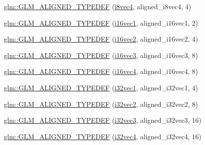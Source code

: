 \begin{DoxyCompactItemize}
\item 
\mbox{\hyperlink{group__gtx__type__aligned_ga1fe6fc032a978f1c845fac9aa0668714}{glm\+::\+G\+L\+M\+\_\+\+A\+L\+I\+G\+N\+E\+D\+\_\+\+T\+Y\+P\+E\+D\+EF}} (\mbox{\hyperlink{group__gtc__type__precision_gaaad99cfb998ddcb74e9c33d0149fdd0e}{i8vec4}}, aligned\+\_\+i8vec4, 4)
\item 
\mbox{\hyperlink{group__gtx__type__aligned_gaa4161e7a496dc96972254143fe873e55}{glm\+::\+G\+L\+M\+\_\+\+A\+L\+I\+G\+N\+E\+D\+\_\+\+T\+Y\+P\+E\+D\+EF}} (\mbox{\hyperlink{group__gtc__type__precision_ga51ac9cc5aa60aa41bf37ccbf900db94f}{i16vec1}}, aligned\+\_\+i16vec1, 2)
\item 
\mbox{\hyperlink{group__gtx__type__aligned_ga9d7cb211ccda69b1c22ddeeb0f3e7aba}{glm\+::\+G\+L\+M\+\_\+\+A\+L\+I\+G\+N\+E\+D\+\_\+\+T\+Y\+P\+E\+D\+EF}} (\mbox{\hyperlink{group__gtc__type__precision_gad912fd04abb876a5b806118ec6e0f283}{i16vec2}}, aligned\+\_\+i16vec2, 4)
\item 
\mbox{\hyperlink{group__gtx__type__aligned_gaaee91dd2ab34423bcc11072ef6bd0f02}{glm\+::\+G\+L\+M\+\_\+\+A\+L\+I\+G\+N\+E\+D\+\_\+\+T\+Y\+P\+E\+D\+EF}} (\mbox{\hyperlink{group__gtc__type__precision_ga1f2b1dd6e4d9109be5f4433c8ff38cb8}{i16vec3}}, aligned\+\_\+i16vec3, 8)
\item 
\mbox{\hyperlink{group__gtx__type__aligned_ga49f047ccaa8b31fad9f26c67bf9b3510}{glm\+::\+G\+L\+M\+\_\+\+A\+L\+I\+G\+N\+E\+D\+\_\+\+T\+Y\+P\+E\+D\+EF}} (\mbox{\hyperlink{group__gtc__type__precision_ga99a249a4cc129cb527c48d3afd38b666}{i16vec4}}, aligned\+\_\+i16vec4, 8)
\item 
\mbox{\hyperlink{group__gtx__type__aligned_ga904e9c2436bb099397c0823506a0771f}{glm\+::\+G\+L\+M\+\_\+\+A\+L\+I\+G\+N\+E\+D\+\_\+\+T\+Y\+P\+E\+D\+EF}} (\mbox{\hyperlink{group__gtc__type__precision_ga97351dd7f0ede9b8b79943f4adcd6a65}{i32vec1}}, aligned\+\_\+i32vec1, 4)
\item 
\mbox{\hyperlink{group__gtx__type__aligned_gaf90651cf2f5e7ee2b11cfdc5a6749534}{glm\+::\+G\+L\+M\+\_\+\+A\+L\+I\+G\+N\+E\+D\+\_\+\+T\+Y\+P\+E\+D\+EF}} (\mbox{\hyperlink{group__gtc__type__precision_ga99191e0de942ecc1df32d522f8064789}{i32vec2}}, aligned\+\_\+i32vec2, 8)
\item 
\mbox{\hyperlink{group__gtx__type__aligned_ga7354a4ead8cb17868aec36b9c30d6010}{glm\+::\+G\+L\+M\+\_\+\+A\+L\+I\+G\+N\+E\+D\+\_\+\+T\+Y\+P\+E\+D\+EF}} (\mbox{\hyperlink{group__gtc__type__precision_ga9811a4ec26e517ea85c785d3f3f4baac}{i32vec3}}, aligned\+\_\+i32vec3, 16)
\item 
\mbox{\hyperlink{group__gtx__type__aligned_gad2ecbdea18732163e2636e27b37981ee}{glm\+::\+G\+L\+M\+\_\+\+A\+L\+I\+G\+N\+E\+D\+\_\+\+T\+Y\+P\+E\+D\+EF}} (\mbox{\hyperlink{group__gtc__type__precision_ga78c16dde5527264e8085b375efba6f28}{i32vec4}}, aligned\+\_\+i32vec4, 16)

\end{DoxyCompactItemize}
